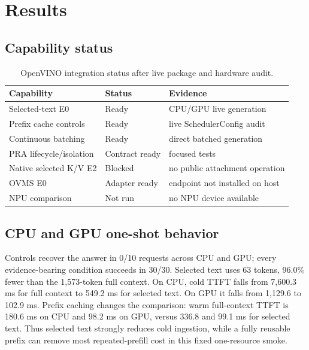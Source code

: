 \documentclass[10pt]{article}
\begin{document}
\section{Results}
\subsection{Capability status}
\begin{table}[H]
\centering
\caption{OpenVINO integration status after live package and hardware audit.}
\begin{tabular}{lll}
\toprule
Capability & Status & Evidence \\
\midrule
Selected-text E0 & Ready & CPU/GPU live generation \\
Prefix cache controls & Ready & live SchedulerConfig audit \\
Continuous batching & Ready & direct batched generation \\
PRA lifecycle/isolation & Contract ready & focused tests \\
Native selected K/V E2 & Blocked & no public attachment operation \\
OVMS E0 & Adapter ready & endpoint not installed on host \\
NPU comparison & Not run & no NPU device available \\
\bottomrule
\end{tabular}
\end{table}

\subsection{CPU and GPU one-shot behavior}
\begin{table}[ht]
\centering
\small
\caption{Evidence-bearing E0 conditions. Visible is mean input tokens; times
are milliseconds. Success is controlled answer recovery.}
\resizebox{\linewidth}{!}{%
}
\end{table}

Controls recover the answer in 0/10 requests across CPU and GPU; every
evidence-bearing condition succeeds in 30/30. Selected text uses 63 tokens,
96.0\% fewer than the 1,573-token full context. On CPU, cold TTFT falls from
7,600.3 ms for full context to 549.2 ms for selected text. On GPU it falls from
1,129.6 to 102.9 ms. Prefix caching changes the comparison: warm full-context
TTFT is 180.6 ms on CPU and 98.2 ms on GPU, versus 336.8 and 99.1 ms for
selected text. Thus selected text strongly reduces cold ingestion, while a
fully reusable prefix can remove most repeated-prefill cost in this fixed
one-resource smoke.
\end{document}
